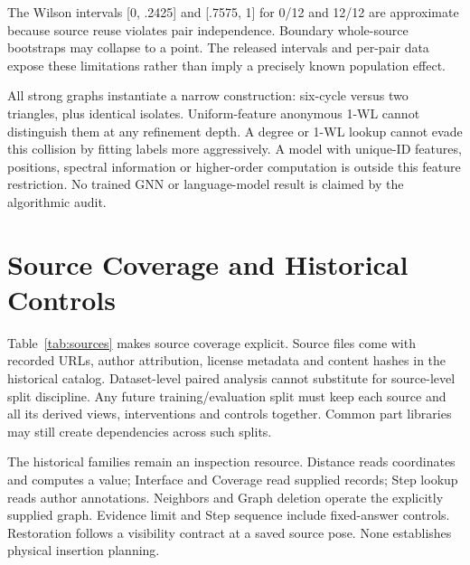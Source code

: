 \documentclass[10pt,twocolumn,letterpaper]{article}
\begin{document}
\begin{table}[H]
\centering\small
\caption{Stored strong-change answer histograms. Equal numbers of
increases/decreases do not imply equal per-answer arm frequencies.}
\label{tab:balance}

\end{table}

The Wilson intervals [0, .2425] and [.7575, 1] for 0/12 and 12/12
are approximate because source reuse violates pair independence.
Boundary whole-source bootstraps may collapse to a point. The
released intervals and per-pair data expose these limitations rather
than imply a precisely known population effect.

All strong graphs instantiate a narrow construction: six-cycle
versus two triangles, plus identical isolates. Uniform-feature
anonymous 1-WL cannot distinguish them at any refinement depth.
A degree or 1-WL lookup cannot evade this collision by fitting labels
more aggressively. A model with unique-ID features, positions,
spectral information or higher-order computation is outside this
feature restriction. No trained GNN or language-model result is
claimed by the algorithmic audit.

\section{Source Coverage and Historical Controls}
\begin{table}[!t]
\centering\small
\caption{All source assemblies. Band is source scale. Color and
Part-type count primary parents, each contributing exactly one A/B
pair. All 24 sources appear in both visual families; variants do not
increase source count.}
\label{tab:sources}

\end{table}

Table~\ref{tab:sources} makes source coverage explicit. Source files
come with recorded URLs, author attribution, license metadata and
content hashes in the historical catalog. Dataset-level paired
analysis cannot substitute for source-level split discipline.
Any future training/evaluation split must keep each source and all
its derived views, interventions and controls together. Common part
libraries may still create dependencies across such splits.

The historical families remain an inspection resource. Distance
reads coordinates and computes a value; Interface and Coverage
read supplied records; Step lookup reads author annotations.
Neighbors and Graph deletion operate the explicitly supplied graph.
Evidence limit and Step sequence include fixed-answer controls.
Restoration follows a visibility contract at a saved source pose.
None establishes physical insertion planning.
\end{document}

